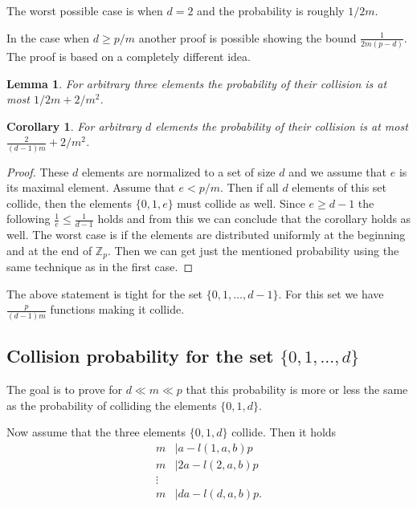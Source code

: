 \documentclass{article}
\newtheorem{lemma}{Lemma}
\newtheorem{corollary}{Corollary}
\begin{document}
The worst possible case is when $d = 2$ and the probability is roughly $1/2m$.

In the case when $d \geq p/m$ another proof is possible showing the bound $\frac{1}{2m(p - d)}$. The proof is based on a completely different idea.

\begin{lemma}
\label{lm:three-elements}
For arbitrary three elements the probability of their collision is at most $1/2m + 2/m^2$.
\end{lemma}

\begin{corollary}
\label{co:d-elements}
For arbitrary $d$ elements the probability of their collision is at most $\frac{2}{(d - 1) m} + 2/m^2$.
\end{corollary}
\begin{proof}
These $d$ elements are normalized to a set of size $d$ and we assume that $e$ is its maximal element.
Assume that $e < p / m$. Then if all $d$ elements of this set collide, then the elements $\{0, 1, e\}$ must collide as well.
Since $e \geq d - 1$ the following $\frac{1}{e} \leq \frac{1}{d - 1}$ holds and from this we can conclude that the corollary holds as well.
The worst case is if the elements are distributed uniformly at the beginning and at the end of $\mathbb{Z}_p$.
Then we can get just the mentioned probability using the same technique as in the first case.
\end{proof}

The above statement is tight for the set $\{0, 1, \ldots, d - 1\}$.
For this set we have $\frac{p}{(d - 1)m}$ functions making it collide.

\subsection{Collision probability for the set $\{0, 1, \ldots, d\}$}

The goal is to prove for $d \ll m \ll p$ that this probability is more or less the same as the probability of colliding the elements $\{0, 1, d\}$.

Now assume that the three elements $\{0, 1, d\}$ collide.
Then it holds
\begin{align*}
m & \mid a - l(1, a, b)p \\
m & \mid 2a - l(2, a, b)p \\
\vdots & \\
m & \mid da - l(d, a, b)p.
\end{align*}
\end{document}
